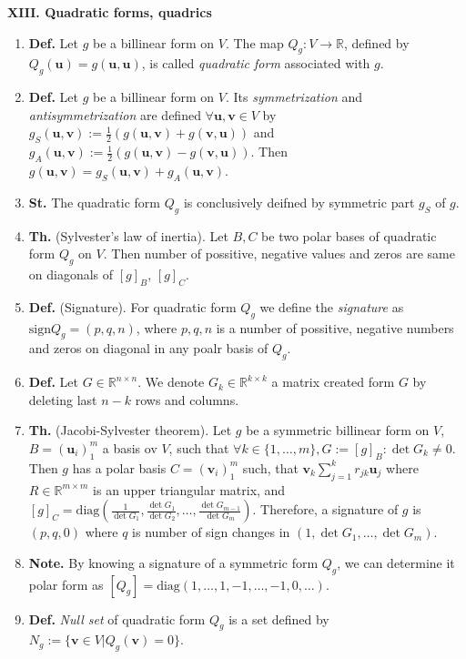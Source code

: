 \documentclass{article}
\newcommand{\<}{\left<}
\renewcommand{\>}{\right>}
\newcommand{\diag}{\text{diag}}
\newcommand{\sign}{\text{sign}}
\newcommand{\R}{\mathbb{R}}
\newcommand{\define}{\textbf{Def. }}
\newcommand{\state}{\textbf{St. }}
\newcommand{\theor}{\textbf{Th. }}
\newcommand{\note}{\textbf{Note. }}
\begin{document}
\begin{multicols}{3}
\begin{enumerate}[itemsep=2pt, topsep=2pt, partopsep=2pt, parsep=2pt]
    \end{enumerate}

    \textbf{XIII. Quadratic forms, quadrics}

    \begin{enumerate}[itemsep=2pt, topsep=2pt, partopsep=2pt, parsep=2pt]

        \item \define Let $g$ be a billinear form on $V$. The map $Q_g:V\to\R$, defined by $Q_g(\bm u)=g(\bm u,\bm u)$, is called \emph{quadratic form} associated with $g$.
        \item \define Let $g$ be a billinear form on $V$. Its \emph{symmetrization} and \emph{antisymmetrization} are defined $\forall\bm u,\bm v\in V$ by $g_S(\bm u,\bm v):=\frac{1}{2}(g(\bm u,\bm v)+g(\bm v,\bm u))$ and $g_A(\bm u,\bm v):=\frac{1}{2}(g(\bm u,\bm v)-g(\bm v,\bm u))$. Then $g(\bm u,\bm v)=g_S(\bm u,\bm v)+g_A(\bm u,\bm v)$.
        \item \state The quadratic form $Q_g$ is conclusively deifned by symmetric part $g_S$ of $g$.
        \item \theor (Sylvester's law of inertia). Let $B,C$ be two polar bases of quadratic form $Q_g$ on $V$. Then number of possitive, negative values and zeros are same on diagonals of $[g]_B$, $[g]_C$.
        \item \define (Signature). For quadratic form $Q_g$ we define the \emph{signature} as $\sign Q_g=(p,q,n)$, where $p,q,n$ is a number of possitive, negative numbers and zeros on diagonal in any poalr basis of $Q_g$.
        \item \define Let $G\in\R^{n\times n}$. We denote $G_k\in\R^{k\times k}$ a matrix created form $G$ by deleting last $n-k$ rows and columns.
        \item \theor (Jacobi-Sylvester theorem). Let $g$ be a symmetric billinear form on $V$, $B=(\bm u_i)_1^m$ a basis ov $V$, such that $\forall k\in\{1,\ldots,m\},G:=[g]_B:\det G_k\neq 0$. Then $g$ has a polar basis $C=(\bm v_i)_1^m$ such, that $\bm v_k\sum_{j=1}^k r_{jk}\bm u_j$ where $R\in\R^{m\times m}$
        is an upper triangular matrix, and $[g]_C=\diag(\frac{1}{\det G_1},\frac{\det G_1}{\det G_2},\ldots,\frac{\det G_{m-1}}{\det G_m})$. Therefore, a signature of $g$ is $(p,q,0)$ where $q$ is number of sign changes in $(1,\det G_1,\ldots,\det G_m)$.
        \item \note By knowing a signature of a symmetric form $Q_g$, we can determine it polar form as $[Q_g]=\diag(1,\ldots,1,-1,\ldots,-1,0,\ldots)$.
        \item \define \emph{Null set} of quadratic form $Q_g$ is a set defined by\\$N_g:=\{\bm v\in V|Q_g(\bm v)=0\}$.


\end{enumerate}
\end{multicols}
\end{document}

